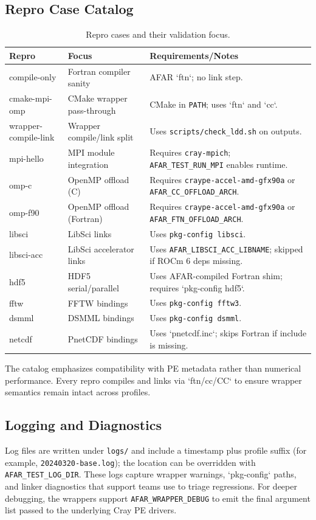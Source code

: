 \subsection{Repro Case Catalog}
\label{sec:harness-catalog}
\begin{table}[t]
  \centering
  \small
  \setlength{\tabcolsep}{4pt}
  \caption{Repro cases and their validation focus.}
  \label{tab:repro-catalog}
  \begin{tabular}{l p{} p{}}
    \hline
    Repro & Focus & Requirements/Notes \\
    \hline
    compile-only & Fortran compiler sanity & AFAR `ftn`; no link step. \\
    cmake-mpi-omp & CMake wrapper pass-through & CMake in \texttt{PATH}; uses `ftn` and `cc`. \\
    wrapper-compile-link & Wrapper compile/link split & Uses \texttt{scripts/check\_ldd.sh} on outputs. \\
    mpi-hello & MPI module integration & Requires \texttt{cray-mpich}; \texttt{AFAR\_TEST\_RUN\_MPI} enables runtime. \\
    omp-c & OpenMP offload (C) & Requires \texttt{craype-accel-}\allowbreak\texttt{amd-gfx90a} or \texttt{AFAR\_CC\_OFFLOAD\_ARCH}. \\
    omp-f90 & OpenMP offload (Fortran) & Requires \texttt{craype-accel-}\allowbreak\texttt{amd-gfx90a} or \texttt{AFAR\_FTN\_OFFLOAD\_ARCH}. \\
    libsci & LibSci links & Uses \texttt{pkg-config libsci}. \\
    libsci-acc & LibSci accelerator links & Uses \texttt{AFAR\_LIBSCI\_ACC\_LIBNAME}; skipped if ROCm 6 deps missing. \\
    hdf5 & HDF5 serial/parallel & Uses AFAR-compiled Fortran shim; requires `pkg-config hdf5`. \\
    fftw & FFTW bindings & Uses \texttt{pkg-config fftw3}. \\
    dsmml & DSMML bindings & Uses \texttt{pkg-config dsmml}. \\
    netcdf & PnetCDF bindings & Uses `pnetcdf.inc`; skips Fortran if include is missing. \\
    \hline
  \end{tabular}
\end{table}

The catalog emphasizes compatibility with PE metadata rather than numerical
performance. Every repro compiles and links via `ftn/cc/CC` to ensure wrapper
semantics remain intact across profiles.

\subsection{Logging and Diagnostics}
\label{sec:harness-logs}
Log files are written under \texttt{logs/} and include a timestamp plus profile
suffix (for example, \texttt{20240320-base.log}); the location can be
overridden with \texttt{AFAR\_TEST\_LOG\_DIR}. These logs
capture wrapper warnings, `pkg-config` paths, and linker diagnostics that
support teams use to triage regressions. For deeper debugging, the wrappers
support \texttt{AFAR\_WRAPPER\_DEBUG} to emit the final argument list passed to
the underlying Cray PE drivers.
